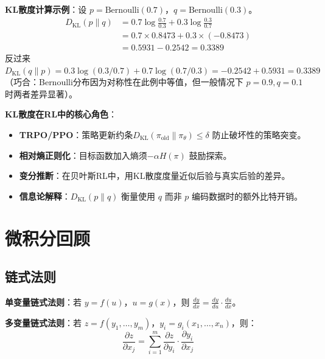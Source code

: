 \begin{example}
\textbf{KL散度计算示例}：设 $p = \mathrm{Bernoulli}(0.7)$，$q = \mathrm{Bernoulli}(0.3)$。
\begin{align*}
D_{\mathrm{KL}}(p \| q) &= 0.7 \log \frac{0.7}{0.3} + 0.3 \log \frac{0.3}{0.7} \\
&= 0.7 \times 0.8473 + 0.3 \times (-0.8473) \\
&= 0.5931 - 0.2542 = 0.3389
\end{align*}
反过来$D_{\mathrm{KL}}(q \| p) = 0.3 \log(0.3/0.7) + 0.7 \log(0.7/0.3) = -0.2542 + 0.5931 = 0.3389$（巧合：Bernoulli分布因为对称性在此例中等值，但一般情况下 $p=0.9, q=0.1$ 时两者差异显著）。
\end{example}

\begin{remark} \textbf{KL散度在RL中的核心角色}：
\begin{itemize}
    \item \textbf{TRPO/PPO}：策略更新约条$D_{\mathrm{KL}}(\pi_{\mathrm{old}} \| \pi_\theta) \le \delta$ 防止破坏性的策略突变。
    \item \textbf{相对熵正则化}：目标函数加入熵须$-\alpha H(\pi)$ 鼓励探索。
    \item \textbf{变分推断}：在贝叶斯RL中，用KL散度度量近似后验与真实后验的差异。
    \item \textbf{信息论解释}：$D_{\mathrm{KL}}(p \| q)$ 衡量使用 $q$ 而非 $p$ 编码数据时的额外比特开销。
\end{itemize}
\end{remark}

\section{微积分回顾}

\subsection{链式法则}

\textbf{单变量链式法则}：若 $y = f(u)$，$u = g(x)$，则 $\frac{dy}{dx} = \frac{dy}{du} \cdot \frac{du}{dx}$。

\textbf{多变量链式法则}：若 $z = f(y_1, \dots, y_m)$，$y_i = g_i(x_1, \dots, x_n)$，则：
\[
\frac{\partial z}{\partial x_j} = \sum_{i=1}^{m} \frac{\partial z}{\partial y_i} \cdot \frac{\partial y_i}{\partial x_j}
\]

